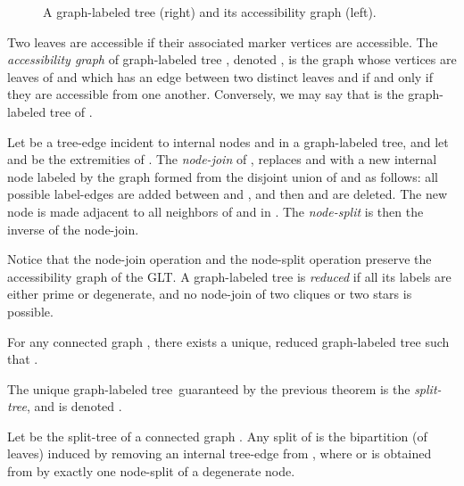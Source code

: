 \documentclass{llncs}
\def\GLT{graph-labeled tree}
\begin{document}
{\begin{figure}
\begin{center}
{
}
\end{center}
\caption{A graph-labeled tree (right) and its accessibility graph (left).}
\end{figure}

Two leaves are accessible if their associated marker vertices are accessible. The \emph{accessibility graph} of graph-labeled tree , denoted , is the graph whose vertices are leaves of  and which has an edge between two distinct leaves  and  if and only if they are accessible from one another. Conversely, we may say that  is the graph-labeled tree of .

\begin{definition}
Let  be a tree-edge incident to internal nodes  and  in a \GLT, and let
 and  be the extremities of . The \emph{node-join} of ,  replaces 
and  with a new internal node  labeled by the graph formed from the disjoint union of  and  as
follows: all possible label-edges are added between  and , and then  and
 are deleted. The new node  is made adjacent to all neighbors of  and  in .
The \emph{node-split} is then the inverse of the node-join.
\end{definition}

Notice that the node-join operation and the node-split operation preserve the
accessibility graph of the GLT. A graph-labeled tree is \emph{reduced} if all its labels are either prime or degenerate, and no node-join of two cliques or two stars is possible.

\begin{theorem}\label{thm:uniquereducedGLT}
For any connected graph , there exists a unique, reduced graph-labeled tree  such that .
\end{theorem}

The unique \GLT~guaranteed by the previous theorem is the \emph{split-tree}, and is denoted .

\begin{theorem}\label{thm:splitinGLT}
Let    be the split-tree of a connected graph . Any split of  is the bipartition
(of leaves) induced by removing an internal tree-edge from , where  or  is
obtained from  by exactly one node-split of a degenerate node.
\end{theorem}


}
\end{document}
